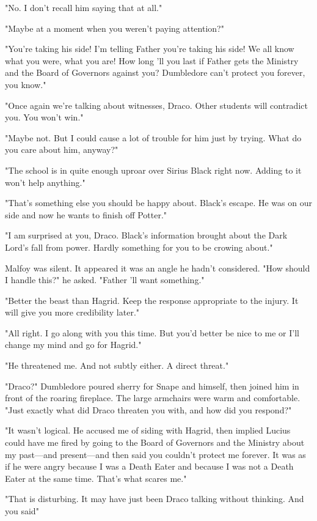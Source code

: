 "No. I don't recall him saying that at all."

"Maybe at a moment when you weren't paying attention?"

"You're taking his side! I'm telling Father you're taking his side! We all know what you were, what you are! How long 'll you last if Father gets the Ministry and the Board of Governors against you? Dumbledore can't protect you forever, you know."

"Once again we're talking about witnesses, Draco. Other students will contradict you. You won't win."

"Maybe not. But I could cause a lot of trouble for him just by trying. What do you care about him, anyway?"

"The school is in quite enough uproar over Sirius Black right now. Adding to it won't help anything."

"That's something else you should be happy about. Black's escape. He was on our side and now he wants to finish off Potter."

"I am surprised at you, Draco. Black's information brought about the Dark Lord's fall from power. Hardly something for you to be crowing about."

Malfoy was silent. It appeared it was an angle he hadn't considered. "How should I handle this?" he asked. "Father 'll want something."

"Better the beast than Hagrid. Keep the response appropriate to the injury. It will give you more credibility later."

"All right. I go along with you this time. But you'd better be nice to me or I'll change my mind and go for Hagrid."

\sbreak

"He threatened me. And not subtly either. A direct threat."

"Draco?" Dumbledore poured sherry for Snape and himself, then joined him in front of the roaring fireplace. The large armchairs were warm and comfortable. "Just exactly what did Draco threaten you with, and how did you respond?"

"It wasn't logical. He accused me of siding with Hagrid, then implied Lucius could have me fired by going to the Board of Governors and the Ministry about my past—and present—and then said you couldn't protect me forever. It was as if he were angry because I was a Death Eater and because I was not a Death Eater at the same time. That's what{\el} scares me."

"That is disturbing. It may have just been Draco talking without thinking. And you said{\el}"


